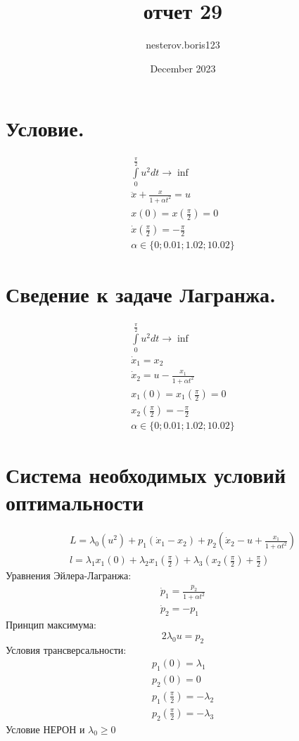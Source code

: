 \documentclass{article}
\title{отчет 29}
\author{nesterov.boris123 }
\date{December 2023}
\begin{document}
\section{Условие.}
\begin{gather*}
  \int\limits_{0}^{\frac \pi 2}u^{2} dt \rightarrow \inf\\
  \ddot x + \frac{x}{1 + \alpha t^{2}} = u\\
  x(0) = x(\frac \pi 2) = 0\\
  \dot{x}(\frac \pi 2) = -\frac \pi 2\\
  \alpha \in \{0;0.01;1.02;10.02\}
\end{gather*}
\section{Сведение к задаче Лагранжа.}
\begin{gather*}
  \int\limits_{0}^{\frac \pi 2}u^{2} dt \rightarrow \inf\\
  \dot x_{1} = x_{2}\\
  \dot x_{2} = u - \frac{x_{1}}{1 + \alpha t^{2}}\\
  x_{1}(0) = x_{1}(\frac \pi 2) = 0\\
  x_{2}(\frac \pi 2) = -\frac \pi 2\\
  \alpha \in \{0;0.01;1.02;10.02\}
\end{gather*}
\section{Система необходимых условий оптимальности}
\begin{gather*}
  L = \lambda_{0}\left(u^{2}\right) + p_{1}(\dot x_{1} - x_{2}) +
  p_{2}\left(\dot x_{2} - u + \frac{x_{1}}{1 + \alpha t^{2}}\right)\\
  l = \lambda_{1}x_{1}(0) + \lambda_{2}x_{1}\left(\frac \pi 2\right)
  + \lambda_{3}\left(x_{2}(\frac \pi 2) + \frac \pi 2\right)
\end{gather*}
Уравнения Эйлера-Лагранжа:
\begin{gather*}
  \dot p_{1} = \frac{p_{2}}{1 + \alpha t^{2}}\\
  \dot p_{2} = -p_{1}
\end{gather*}
Принцип максимума:
$$2\lambda_{0}u = p_{2}$$
Условия трансверсальности:
\begin{gather*}
  p_{1}(0) = \lambda_{1}\\
  p_{2}(0) = 0\\
  p_{1}(\frac \pi 2) = -\lambda_{2}\\
  p_{2}(\frac \pi 2) = -\lambda_{3}
\end{gather*}
Условие НЕРОН и $\lambda_{0} \ge 0$
\end{document}

